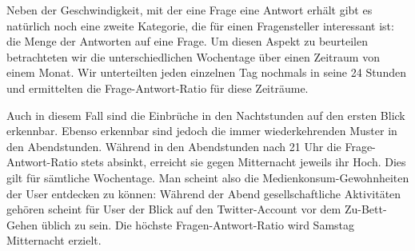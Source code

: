 \documentclass[main.tex]{subfiles}
\begin{document}
Neben der Geschwindigkeit, mit der eine Frage eine Antwort erhält gibt es natürlich noch eine zweite Kategorie, die für einen Fragensteller interessant ist: die Menge der Antworten auf eine Frage. Um diesen Aspekt zu beurteilen betrachteten wir die unterschiedlichen Wochentage über einen Zeitraum von einem Monat. Wir unterteilten jeden einzelnen Tag nochmals in seine 24 Stunden und ermittelten die Frage-Antwort-Ratio für diese Zeiträume.

\datatable
\makeatletter
{}
\makeatother


\begin{center}
\end{center}

Auch in diesem Fall sind die Einbrüche in den Nachtstunden auf den ersten Blick erkennbar. Ebenso erkennbar sind jedoch die immer wiederkehrenden Muster in den Abendstunden. Während in den Abendstunden nach 21 Uhr die Frage-Antwort-Ratio stets absinkt, erreicht sie gegen Mitternacht jeweils ihr Hoch. Dies gilt für sämtliche Wochentage. Man scheint also die Medienkonsum-Gewohnheiten der User entdecken zu können: Während der Abend gesellschaftliche Aktivitäten gehören scheint für User der Blick auf den Twitter-Account vor dem Zu-Bett-Gehen üblich zu sein. Die höchste Fragen-Antwort-Ratio wird Samstag Mitternacht erzielt.
\end{document}
